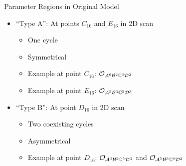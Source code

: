 \begin{frame}{Parameter Regions in Original Model}
    \begin{itemize}
        \item ``Type A'': At points $C_{16}$ and $E_{16}$ in 2D scan
              \begin{itemize}
                  \item One cycle
                  \item Symmetrical
                  \item Example at point $C_{16}$: $\mathcal{O}_{\mathcal{A}^6\mathcal{B}^2\mathbb{C}^6\mathcal{D}^2}$
                  \item Example at point $E_{16}$: $\mathcal{O}_{\mathcal{A}^5\mathcal{B}^3\mathbb{C}^5\mathcal{D}^3}$ \vspace*{1em}
              \end{itemize}
        \item ``Type B'': At point $D_{16}$ in 2D scan
              \begin{itemize}
                  \item Two coexisting cycles
                  \item Asymmetrical
                  \item Example at point $D_{16}$: $\mathcal{O}_{\mathcal{A}^6\mathcal{B}^2\mathbb{C}^5\mathcal{D}^3}$ and $\mathcal{O}_{\mathcal{A}^5\mathcal{B}^3\mathbb{C}^6\mathcal{D}^2}$
              \end{itemize}
    \end{itemize}
\end{frame}